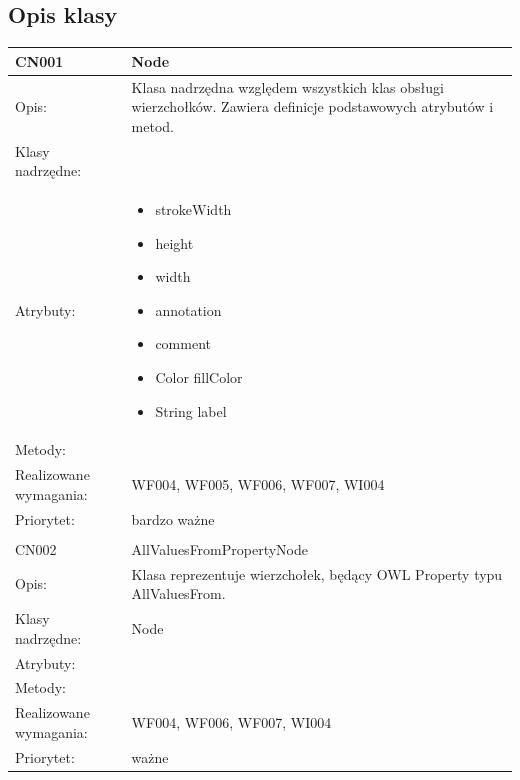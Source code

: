 \documentclass[a4paper,10pt]{article}
\begin{document}
\subsection{Opis klasy}

\begin{center}
 


\begin{longtable}{|m{3cm}|m{9cm}|} \hline

CN001 & Node \\ \hline
Opis: & Klasa nadrzędna względem wszystkich klas obsługi wierzchołków. Zawiera definicje podstawowych atrybutów i metod.    \\ \hline
Klasy nadrzędne: &     \\ \hline
Atrybuty: & \begin{itemize}
 \item strokeWidth
 \item height
 \item width
 \item annotation
 \item comment
\item Color fillColor
\item String label
\end{itemize}
 \\ \hline
Metody: &%
  \\ \hline
Realizowane wymagania: & WF004, WF005, WF006, WF007, WI004 \\ \hline
Priorytet: & bardzo ważne  \\ \hline

\multicolumn{2}{c}{} \\
 \hline

CN002 & AllValuesFromPropertyNode \\ \hline
Opis: & Klasa reprezentuje wierzchołek, będący OWL Property typu AllValuesFrom.    \\ \hline
Klasy nadrzędne: & Node     \\ \hline
Atrybuty: & 
 \\ \hline
Metody: & %
  \\ \hline
Realizowane wymagania: & WF004, WF006, WF007, WI004 \\ \hline
Priorytet: & ważne \\ \hline


\end{longtable}
\end{center}
\end{document}
